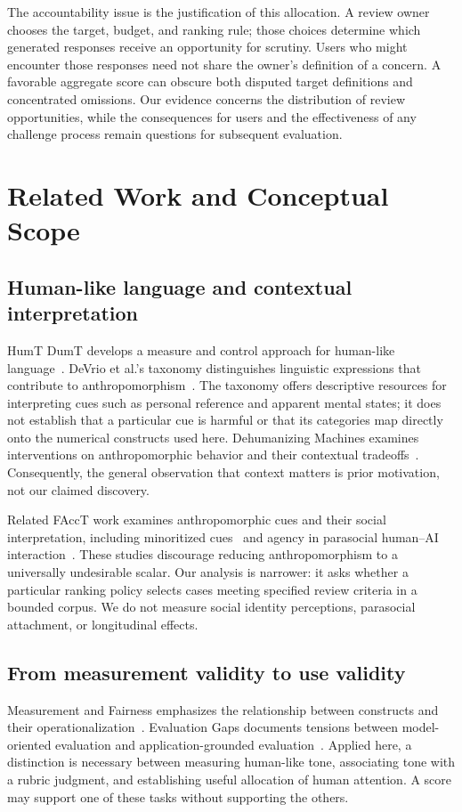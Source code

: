 \documentclass[manuscript,screen,review,anonymous]{acmart}
\begin{document}
The accountability issue is the justification of this allocation. A review owner chooses the target, budget, and ranking rule; those choices determine which generated responses receive an opportunity for scrutiny. Users who might encounter those responses need not share the owner's definition of a concern. A favorable aggregate score can obscure both disputed target definitions and concentrated omissions. Our evidence concerns the distribution of review opportunities, while the consequences for users and the effectiveness of any challenge process remain questions for subsequent evaluation.

\section{Related Work and Conceptual Scope}
\subsection{Human-like language and contextual interpretation}
HumT DumT develops a measure and control approach for human-like language~\cite{cheng2025humt}. DeVrio et al.'s taxonomy distinguishes linguistic expressions that contribute to anthropomorphism~\cite{devrio2025taxonomy}. The taxonomy offers descriptive resources for interpreting cues such as personal reference and apparent mental states; it does not establish that a particular cue is harmful or that its categories map directly onto the numerical constructs used here. Dehumanizing Machines examines interventions on anthropomorphic behavior and their contextual tradeoffs~\cite{cheng2025dehumanizing}. Consequently, the general observation that context matters is prior motivation, not our claimed discovery.

Related FAccT work examines anthropomorphic cues and their social interpretation, including minoritized cues~\cite{basoah2025hunty} and agency in parasocial human--AI interaction~\cite{maeda2024parasocial}. These studies discourage reducing anthropomorphism to a universally undesirable scalar. Our analysis is narrower: it asks whether a particular ranking policy selects cases meeting specified review criteria in a bounded corpus. We do not measure social identity perceptions, parasocial attachment, or longitudinal effects.

\subsection{From measurement validity to use validity}
Measurement and Fairness emphasizes the relationship between constructs and their operationalization~\cite{jacobs2021measurement}. Evaluation Gaps documents tensions between model-oriented evaluation and application-grounded evaluation~\cite{hutchinson2022gaps}. Applied here, a distinction is necessary between measuring human-like tone, associating tone with a rubric judgment, and establishing useful allocation of human attention. A score may support one of these tasks without supporting the others.
\end{document}
